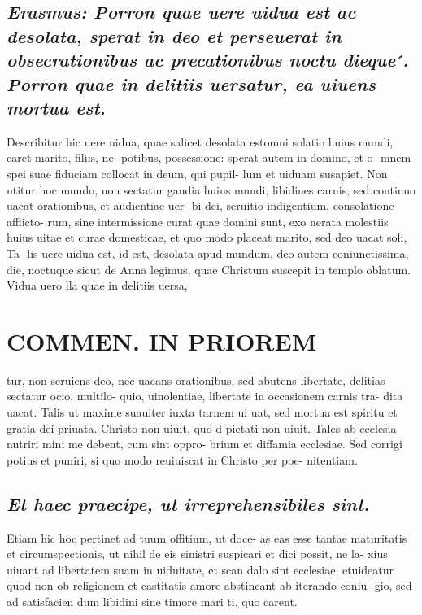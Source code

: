 \documentclass{article}
\begin{document}
\begin{pages}
\subsection*{\textit{Erasmus: Porron quae uere uidua est ac desolata, sperat in deo et perseuerat in obsecrationibus ac precationibus noctu dieque ́. Porron quae in delitiis uersatur, ea uiuens mortua est. }}\pstart Describitur hic uere uidua, quae salicet desolata estomni solatio huius mundi, caret marito, filiis, ne- potibus, possessione: sperat autem in domino, et o- mnem spei suae fiduciam collocat in deum, qui pupil- lum et uiduam susapiet. Non utitur hoc mundo, non sectatur gaudia huius mundi, libidines carnis, sed continuo uacat orationibus, et audientiae uer- bi dei, seruitio indigentium, consolatione afflicto- rum, sine intermissione curat quae domini sunt, exo nerata molestiis huius uitae et curae domesticae, et quo modo placeat marito, sed deo uacat soli, Ta- lis uere uidua est, id est, desolata apud mundum, deo autem coniunctissima, die, noctuque sicut de Anna legimus, quae Christum suscepit in templo oblatum. Vidua uero lla quae in delitiis uersa,  \pend
\section*{COMMEN. IN PRIOREM }
\marginpar{[ p.120 ]}\pstart tur, non seruiens deo, nec uacans orationibus, sed abutens libertate, delitias sectatur ocio, multilo- quio, uinolentiae, libertate in occasionem carnis tra- dita uacat. Talis ut maxime suauiter iuxta tarnem ui uat, sed mortua est spiritu et gratia dei priuata. Christo non uiuit, quo d pietati non uiuit. Tales ab ccelesia nutriri mini me debent, cum sint oppro- brium et diffamia ecclesiae. Sed corrigi potius et puniri, si quo modo reuiuiscat in Christo per poe- nitentiam.  \pend
{}
{}
\subsection*{\textit{Et haec praecipe, ut irreprehensibiles sint. }}\pstart Etiam hic hoc pertinet ad tuum offitium, ut doce- as eas esse tantae maturitatis et circumspectionis, ut nihil de eis sinistri suspicari et dici possit, ne la- xius uiuant ad libertatem suam in uiduitate, et scan dalo sint ecclesiae, etuideatur quod non ob religionem et castitatis amore abstincant ab iterando coniu- gio, sed ad satisfacien dum libidini sine timore mari ti, quo carent.  \pend
{}
{}

\end{pages}
\end{document}
